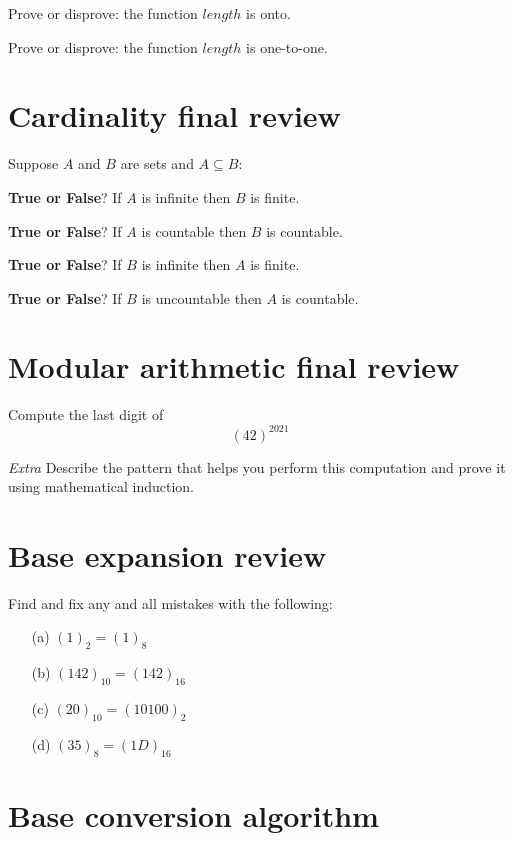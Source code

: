 \documentclass[12pt, oneside]{article}
\begin{document}
Prove or disprove: the function $length$ is onto.

\vfill

Prove or disprove: the function $length$ is one-to-one.

\vfill
 \vfill
\section*{Cardinality final review}


Suppose $A$ and $B$ are sets and $A \subseteq B$:

{\bf True or False}?  If $A$ is infinite then $B$ is finite.

\vspace{50pt}

{\bf True or False}?  If $A$ is countable then $B$ is countable.

\vspace{50pt}

{\bf True or False}?  If $B$ is infinite then $A$ is finite.

\vspace{50pt}

{\bf True or False}?  If $B$ is uncountable then $A$ is countable.

\vspace{50pt} \vfill
\section*{Modular arithmetic final review}


Compute the last digit of 
\[
    (42)^{2021}
\]

\vfill

{\it Extra} Describe the pattern that helps you perform this computation 
and prove it using mathematical induction. \vfill
\section*{Base expansion review}


Find and fix any and all mistakes with the following:
\begin{itemize}
\item[(a)] $(1)_2 = (1)_8$
\item[(b)] $(142)_{10} = (142)_{16}$
\item[(c)] $(20)_{10} = (10100)_2$
\item[(d)] $(35)_8 = (1D)_{16}$
\end{itemize} \vfill
\section*{Base conversion algorithm}
\end{document}
